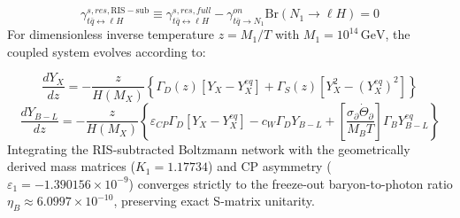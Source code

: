 \documentclass[aps,prd,onecolumn,superscriptaddress,nofootinbib,longbibliography,10pt]{revtex4-2}
\begin{document}
\[\gamma_{t\bar{q}\leftrightarrow\ell H}^{s,res,\mathrm{RIS-sub}} \equiv \gamma_{t\bar{q}\leftrightarrow\ell H}^{s,res,full} - \gamma_{t\bar{q}\to N_1}^{on}\mathrm{Br}(N_1 \to \ell H) = 0\]
For dimensionless inverse temperature \(z = M_1/T\) with \(M_1 = 10^{14}\,\mathrm{GeV}\), the coupled system evolves according to:


\[\frac{dY_X}{dz} = -\frac{z}{H(M_X)}\left\{\Gamma_D(z)[Y_X - Y_X^{eq}] + \Gamma_S(z)[Y_X^2 - (Y_X^{eq})^2]\right\}\]
\[\frac{dY_{B-L}}{dz} = -\frac{z}{H(M_X)}\left\{\varepsilon_{CP}\Gamma_D[Y_X - Y_X^{eq}] - c_W \Gamma_D Y_{B-L} + \left[\frac{\sigma_\partial \dot{\Theta}_\partial}{M_B T}\right]\Gamma_B Y_{B-L}^{eq}\right\}\]
Integrating the RIS-subtracted Boltzmann network with the geometrically derived mass matrices (\(K_1 = 1.17734\)) and CP asymmetry (\(\varepsilon_1 = -1.390156 \times 10^{-9}\)) converges strictly to the freeze-out baryon-to-photon ratio \(\eta_B \approx 6.0997 \times 10^{-10}\), preserving exact S-matrix unitarity.
\end{document}
